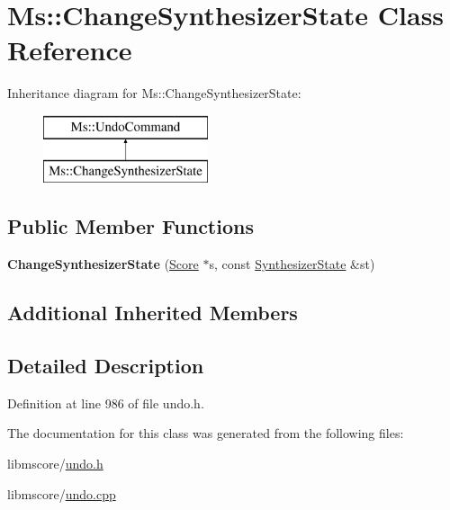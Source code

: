 \hypertarget{class_ms_1_1_change_synthesizer_state}{}\section{Ms\+:\+:Change\+Synthesizer\+State Class Reference}
\label{class_ms_1_1_change_synthesizer_state}
Inheritance diagram for Ms\+:\+:Change\+Synthesizer\+State\+:\begin{figure}[H]
\begin{center}
\leavevmode
\includegraphics[height=2.000000cm]{class_ms_1_1_change_synthesizer_state}
\end{center}
\end{figure}
\subsection*{Public Member Functions}
\begin{DoxyCompactItemize}
\item 
\mbox{\label{class_ms_1_1_change_synthesizer_state_a584b81c0a9e066dc678af70040777501}} 
{\bfseries Change\+Synthesizer\+State} (\hyperlink{class_ms_1_1_score}{Score} $\ast$s, const \hyperlink{class_ms_1_1_synthesizer_state}{Synthesizer\+State} \&st)
\end{DoxyCompactItemize}
\subsection*{Additional Inherited Members}


\subsection{Detailed Description}


Definition at line 986 of file undo.\+h.



The documentation for this class was generated from the following files\+:\begin{DoxyCompactItemize}
\item 
libmscore/\hyperlink{undo_8h}{undo.\+h}\item 
libmscore/\hyperlink{undo_8cpp}{undo.\+cpp}\end{DoxyCompactItemize}
